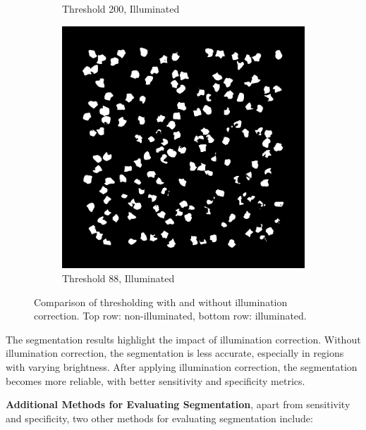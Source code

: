 \documentclass[%
	a4paper, %
	12pt, %
	english, %
	bibtotoc %
]{scrartcl}
\begin{document}
\begin{figure}[H]
\begin{subfigure}{0.3\linewidth}
        \caption{Threshold 200, Illuminated}
        \label{fig:segmentation_200_threshold_illuminated}
    \end{subfigure}
    \begin{subfigure}{0.3\linewidth}
        \includegraphics[width=\linewidth]{latex-template-ss24/images/segmentation_88_threshold_illuminated.png}
        \caption{Threshold 88, Illuminated}
        \label{fig:segmentation_88_threshold_illuminated}
    \end{subfigure}
    
    \caption{Comparison of thresholding with and without illumination correction. Top row: non-illuminated, bottom row: illuminated.}
    \label{fig:segmentation_comparison}
\end{figure}

The segmentation results highlight the impact of illumination correction. Without illumination correction, the segmentation is less accurate, especially in regions with varying brightness. After applying illumination correction, the segmentation becomes more reliable, with better sensitivity and specificity metrics. 

\textbf{Additional Methods for Evaluating Segmentation}, apart from sensitivity and specificity, two other methods for evaluating segmentation include:
\end{document}
